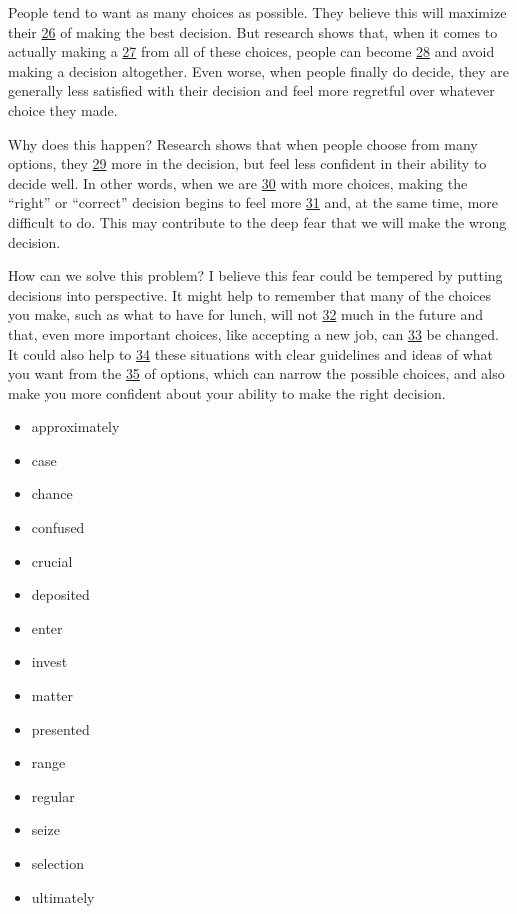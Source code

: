 \documentclass[UTF8,11pt]{ctexart}
\begin{document}
People tend to want as many choices as possible. They believe this will maximize their \uline{26} of making the best decision. But research shows that, when it comes to actually making a \uline{27} from all of these choices, people can become \uline{28} and avoid making a decision altogether. Even worse, when people finally do decide, they are generally less satisfied with their decision and feel more regretful over whatever choice they made.


Why does this happen? Research shows that when people choose from many options, they \uline{29} more in the decision, but feel less confident in their ability to decide well. In other words, when we are \uline{30} with more choices, making the “right” or “correct” decision begins to feel more \uline{31} and, at the same time, more difficult to do. This may contribute to the deep fear that we will make the wrong decision.


How can we solve this problem? I believe this fear could be tempered by putting decisions into perspective. It might help to remember that many of the choices you make, such as what to have for lunch, will not \uline{32} much in the future and that, even more important choices, like accepting a new job, can \uline{33} be changed. It could also help to \uline{34} these situations with clear guidelines and ideas of what you want from the \uline{35} of options, which can narrow the possible choices, and also make you more confident about your ability to make the right decision.


\begin{itemize}[leftmargin=2em,itemsep=.2em,topsep=.4em]\item[A.] approximately
\item[B.] case
\item[C.] chance
\item[D.] confused
\item[E.] crucial
\item[F.] deposited
\item[G.] enter
\item[H.] invest
\item[I.] matter
\item[J.] presented
\item[K.] range
\item[L.] regular
\item[M.] seize
\item[N.] selection
\item[O.] ultimately
\end{itemize}
\end{document}
